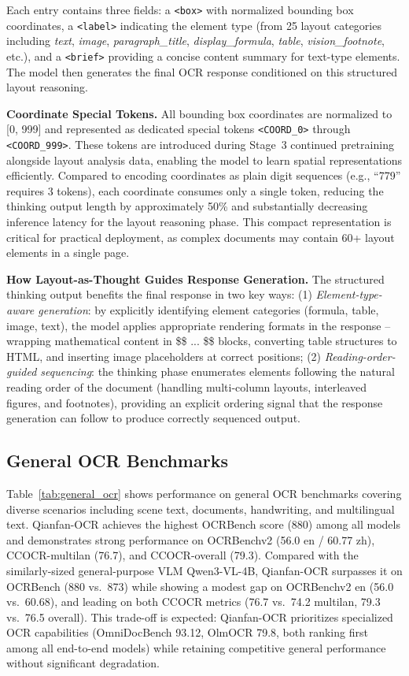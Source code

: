 \documentclass[dvipsnames]{article}
\begin{document}
Each entry contains three fields: a \texttt{<box>} with normalized bounding box coordinates, a \texttt{<label>} indicating the element type (from 25 layout categories including \textit{text}, \textit{image}, \textit{paragraph\_title}, \textit{display\_formula}, \textit{table}, \textit{vision\_footnote}, etc.), and a \texttt{<brief>} providing a concise content summary for text-type elements. The model then generates the final OCR response conditioned on this structured layout reasoning.

\textbf{Coordinate Special Tokens.} All bounding box coordinates are normalized to [0, 999] and represented as dedicated special tokens \texttt{<COORD\_0>} through \texttt{<COORD\_999>}. These tokens are introduced during Stage~3 continued pretraining alongside layout analysis data, enabling the model to learn spatial representations efficiently. Compared to encoding coordinates as plain digit sequences (e.g., ``779'' requires 3 tokens), each coordinate consumes only a single token, reducing the thinking output length by approximately 50\% and substantially decreasing inference latency for the layout reasoning phase. This compact representation is critical for practical deployment, as complex documents may contain 60+ layout elements in a single page.

\textbf{How Layout-as-Thought Guides Response Generation.} The structured thinking output benefits the final response in two key ways: (1) \textit{Element-type-aware generation}: by explicitly identifying element categories (formula, table, image, text), the model applies appropriate rendering formats in the response -- wrapping mathematical content in \$\$ ... \$\$ blocks, converting table structures to HTML, and inserting image placeholders at correct positions; (2) \textit{Reading-order-guided sequencing}: the thinking phase enumerates elements following the natural reading order of the document (handling multi-column layouts, interleaved figures, and footnotes), providing an explicit ordering signal that the response generation can follow to produce correctly sequenced output.

\subsection{General OCR Benchmarks}

Table~\ref{tab:general_ocr} shows performance on general OCR benchmarks covering diverse scenarios including scene text, documents, handwriting, and multilingual text. Qianfan-OCR achieves the highest OCRBench score (880) among all models and demonstrates strong performance on OCRBenchv2 (56.0 en / 60.77 zh), CCOCR-multilan (76.7), and CCOCR-overall (79.3). Compared with the similarly-sized general-purpose VLM Qwen3-VL-4B, Qianfan-OCR surpasses it on OCRBench (880 vs.\ 873) while showing a modest gap on OCRBenchv2 en (56.0 vs.\ 60.68), and leading on both CCOCR metrics (76.7 vs.\ 74.2 multilan, 79.3 vs.\ 76.5 overall). This trade-off is expected: Qianfan-OCR prioritizes specialized OCR capabilities (OmniDocBench 93.12, OlmOCR 79.8, both ranking first among all end-to-end models) while retaining competitive general performance without significant degradation.
\end{document}
